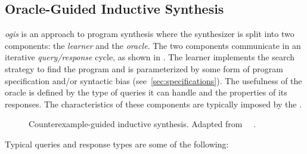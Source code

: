 \subsection{Oracle-Guided Inductive Synthesis}
\label{sec:ogis}

\textit{\Gls{ogis}} is an approach to program synthesis where the synthesizer is
split into two components: the \textit{learner} and the \textit{oracle}. The two
components communicate in an iterative \textit{query/response} cycle, as shown
in . The learner implements the search strategy to
find the program and is parameterized by some form of program specification
and/or syntactic bias (see~\ref{sec:specifications}). The usefulness of the
oracle is defined by the type of queries it can handle and the properties of its
responses. The characteristics of these components are typically imposed by the
.


\begin{figure}
  \centering
  \caption{Counterexample-guided inductive synthesis. Adapted from
    ~\protect\citeauthor{Gulwani2017}~\protect\cite{Gulwani2017}.}

  \label{fig:cegis}
\end{figure}


Typical queries and response types are some of the following:

